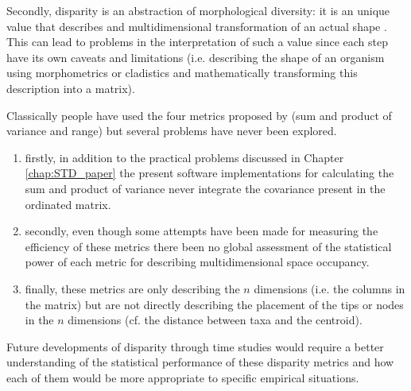 %
%

Secondly, disparity is an abstraction of morphological diversity: it is an unique value that describes and multidimensional transformation of an actual shape \citep{Wills1994,foote1997evolution}. %
This can lead to problems in the interpretation of such a value since each step have its own caveats and limitations (i.e. describing the shape of an organism using morphometrics or cladistics and mathematically transforming this description into a matrix).

Classically people have used the four metrics proposed by \cite{Wills1994} (sum and product of variance and range) but several problems have never been explored.
\begin{enumerate}
\item firstly, in addition to the practical problems discussed in Chapter \ref{chap:STD_paper} the present software implementations for calculating the sum and product of variance never integrate the covariance present in the ordinated matrix.
\item secondly, even though some attempts have been made for measuring the efficiency of these metrics \citep{Ciampaglio2001} there been no global assessment of the statistical power of each metric for describing multidimensional space occupancy.
\item finally, these metrics are only describing the $n$ dimensions (i.e. the columns in the matrix) but are not directly describing the placement of the tips or nodes in the $n$ dimensions (cf. the distance between taxa and the centroid). %
\end{enumerate}
Future developments of disparity through time studies would require a better understanding of the statistical performance of these disparity metrics and how each of them would be more appropriate to specific empirical situations. %

